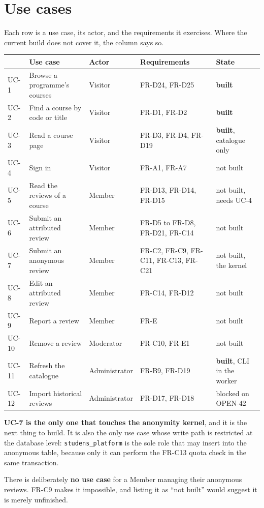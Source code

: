 \documentclass[11pt,a4paper]{article}
\begin{document}
\newpage
\section{Use cases}

Each row is a use case, its actor, and the requirements it exercises. Where the
current build does not cover it, the column says so.

\begin{center}
\sffamily\scriptsize
\renewcommand{\arraystretch}{1.35}
\begin{tabular}{@{}p{1.15cm}p{3.4cm}p{1.9cm}p{4.4cm}p{3.3cm}@{}}
\toprule
& \textbf{Use case} & \textbf{Actor} & \textbf{Requirements} & \textbf{State} \\
\midrule
UC-1 & Browse a programme's courses & Visitor & FR-D24, FR-D25 & \textbf{built} \\
UC-2 & Find a course by code or title & Visitor & FR-D1, FR-D2 & \textbf{built} \\
UC-3 & Read a course page & Visitor & FR-D3, FR-D4, FR-D19 & \textbf{built}, catalogue only \\
UC-4 & Sign in & Visitor & FR-A1, FR-A7 & not built \\
UC-5 & Read the reviews of a course & Member & FR-D13, FR-D14, FR-D15 & not built, needs UC-4 \\
UC-6 & Submit an attributed review & Member & FR-D5 to FR-D8, FR-D21, FR-C14 & not built \\
UC-7 & Submit an anonymous review & Member & FR-C2, FR-C9, FR-C11, FR-C13, FR-C21 & not built, the kernel \\
UC-8 & Edit an attributed review & Member & FR-C14, FR-D12 & not built \\
UC-9 & Report a review & Member & FR-E & not built \\
UC-10 & Remove a review & Moderator & FR-C10, FR-E1 & not built \\
UC-11 & Refresh the catalogue & Administrator & FR-B9, FR-D19 & \textbf{built}, CLI in the worker \\
UC-12 & Import historical reviews & Administrator & FR-D17, FR-D18 & blocked on OPEN-42 \\
\bottomrule
\end{tabular}
\end{center}

\begin{careful}
\textbf{UC-7 is the only one that touches the anonymity kernel}, and it is the
next thing to build. It is also the only use case whose write path is restricted
at the database level: \texttt{studens\_platform} is the sole role that may
insert into the anonymous table, because only it can perform the FR-C13 quota
check in the same transaction.

There is deliberately \textbf{no use case} for a Member managing their anonymous
reviews. FR-C9 makes it impossible, and listing it as ``not built'' would
suggest it is merely unfinished.
\end{careful}
\end{document}
